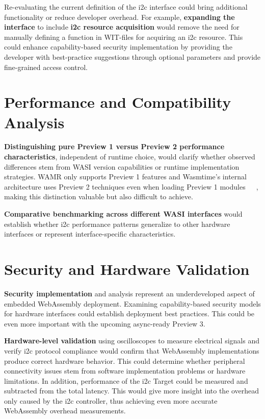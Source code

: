 Re-evaluating the current definition of the \acrshort{i2c} interface could bring additional functionality or reduce developer overhead. For example, \textbf{expanding the interface} to include \textbf{\acrshort{i2c} resource acquisition} would remove the need for manually defining a function in WIT-files for acquiring an \acrshort{i2c} resource. This could enhance capability-based security implementation by providing the developer with best-practice suggestions through optional parameters and provide fine-grained access control.

\section*{Performance and Compatibility Analysis}
\label{sec:performance-compatibility}

\textbf{Distinguishing pure Preview 1 versus Preview 2 performance characteristics}, independent of runtime choice, would clarify whether observed differences stem from WASI version capabilities or runtime implementation strategies. WAMR only supports Preview 1 features and Wasmtime's internal architecture uses Preview 2 techniques even when loading Preview 1 modules~\cite{wasmtime_and_cranelift_2023}~\cite{wasmtime_p1_crate_docs}~\cite{wasmtime_p2_crate_docs}, making this distinction valuable but also difficult to achieve.

\textbf{Comparative benchmarking across different WASI interfaces} would establish whether \acrshort{i2c} performance patterns generalize to other hardware interfaces or represent interface-specific characteristics.

\section*{Security and Hardware Validation}
\label{sec:security-hardware}

\textbf{Security implementation} and analysis represent an underdeveloped aspect of embedded WebAssembly deployment. Examining capability-based security models for hardware interfaces could establish deployment best practices. This could be even more important with the upcoming async-ready Preview 3.

\textbf{Hardware-level validation} using oscilloscopes to measure electrical signals and verify \acrshort{i2c} protocol compliance would confirm that WebAssembly implementations produce correct hardware behavior. This could determine whether peripheral connectivity issues stem from software implementation problems or hardware limitations. In addition, performance of the \acrshort{i2c} Target could be measured and subtracted from the total latency. This would give more insight into the overhead only caused by the \acrshort{i2c} controller, thus achieving even more accurate WebAssembly overhead measurements.


